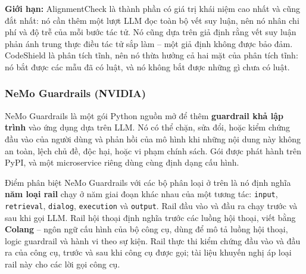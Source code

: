 \textbf{Giới hạn:} AlignmentCheck là thành phần có giá trị khái niệm cao nhất và cũng đắt nhất: nó cần thêm một lượt LLM đọc toàn bộ vết suy luận, nên nó nhân chi phí và độ trễ của mỗi bước tác tử. Nó cũng dựa trên giả định rằng vết suy luận phản ánh trung thực điều tác tử sắp làm -- một giả định không được bảo đảm. CodeShield là phân tích tĩnh, nên nó thừa hưởng cả hai mặt của phân tích tĩnh: nó bắt được các mẫu đã có luật, và nó không bắt được những gì chưa có luật.

\subsubsection{NeMo Guardrails (NVIDIA)}

NeMo Guardrails là một gói Python nguồn mở để thêm \textbf{guardrail khả lập trình} vào ứng dụng dựa trên LLM. Nó có thể chặn, sửa đổi, hoặc kiểm chứng đầu vào của người dùng và phản hồi của mô hình khi những nội dung này không an toàn, lệch chủ đề, độc hại, hoặc vi phạm chính sách. Gói được phát hành trên PyPI, và một microservice riêng dùng cùng định dạng cấu hình.

Điểm phân biệt NeMo Guardrails với các bộ phân loại ở trên là nó định nghĩa \textbf{năm loại rail} chạy ở năm giai đoạn khác nhau của một tương tác: \texttt{input}, \texttt{retrieval}, \texttt{dialog}, \texttt{execution} và \texttt{output}. Rail đầu vào và đầu ra chạy trước và sau khi gọi LLM. Rail hội thoại định nghĩa trước các luồng hội thoại, viết bằng \textbf{Colang} -- ngôn ngữ cấu hình của bộ công cụ, dùng để mô tả luồng hội thoại, logic guardrail và hành vi theo sự kiện. Rail thực thi kiểm chứng đầu vào và đầu ra của công cụ, trước và sau khi công cụ được gọi; tài liệu khuyến nghị áp loại rail này cho các lời gọi công cụ.

